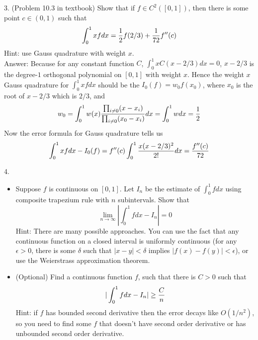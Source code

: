 \documentclass[20pt]{article} %
\theoremstyle{break}
\begin{document}
3. (Problem 10.3 in textbook) Show that if $f\in C^2([0, 1])$, then there is some point $c\in (0, 1)$ such that
\[\int_0^1xfdx={1\over 2}f(2/3)+{1\over 72}f''(c)\]
Hint: use Gauss quadrature with weight $x$.\\

Answer: Because for any constant function $C$, $\int_0^1xC(x-2/3)dx=0$, $x-2/3$ is the degree-$1$ orthogonal polynomial on $[0, 1]$ with weight $x$. Hence the weight $x$ Gauss quadrature for $\int_0^1xfdx$ should be the $I_0(f)=w_0f(x_0)$, where $x_0$ is the root of $x-2/3$ which is $2/3$, and
\[w_0=\int_0^1w(x){\prod_{i\not=0}(x-x_i)\over \prod_{i\not=0}(x_0-x_i)}dx=\int_0^1wdx={1\over 2}\]
Now the error formula for Gauss quadrature tells us
\[\int_0^1xfdx-I_0(f)=f''(c)\int_0^1{x(x-2/3)^2\over 2!}dx={f''(c)\over 72}\]

4. \begin{itemize}
\item Suppose $f$ is continuous on $[0, 1]$. Let $I_n$ be the estimate of $\int_0^1fdx$ using composite trapezium rule with $n$ subintervals. Show that
  \[\lim_{n\rightarrow\infty}|\int_0^1fdx-I_n|=0\]
 Hint: There are many possible approaches. You can use the fact that any continuous function on a closed interval is uniformly continuous (for any $\epsilon>0$, there is some $\delta$ such that $|x-y|<\delta$ implies $|f(x)-f(y)|<\epsilon$), or use the Weierstrass approximation theorem.
\item (Optional) Find a continuous function $f$, such that there is $C>0$ such that 
  \[|\int_0^1fdx-I_n|\geq {C\over n}\]
  Hint: if $f$ has bounded second derivative then the error decays like $O(1/n^2)$, so you need to find some $f$ that doesn't have second order derivative or has unbounded second order derivative.
\end{itemize}
\end{document}
